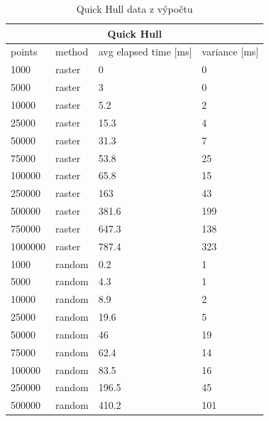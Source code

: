 \documentclass[12pt]{article}
\begin{document}
\begin{table}[h!]
\centering
\caption{Quick Hull data z výpočtu}
\begin{tabular}{|l|l|l|l|}
\hline
\multicolumn{4}{|c|}{\textbf{Quick Hull}}                        \\ \hline
points  & method & avg elapsed time {[}ms{]} & variance {[}ms{]} \\ \hline
1000    & raster & 0                         & 0                 \\ \hline
5000    & raster & 3                         & 0                 \\ \hline
10000   & raster & 5.2                       & 2                 \\ \hline
25000   & raster & 15.3                      & 4                 \\ \hline
50000   & raster & 31.3                      & 7                 \\ \hline
75000   & raster & 53.8                      & 25                \\ \hline
100000  & raster & 65.8                      & 15                \\ \hline
250000  & raster & 163                       & 43                \\ \hline
500000  & raster & 381.6                     & 199               \\ \hline
750000  & raster & 647.3                     & 138               \\ \hline
1000000 & raster & 787.4                     & 323               \\ \hline
1000    & random & 0.2                       & 1                 \\ \hline
5000    & random & 4.3                       & 1                 \\ \hline
10000   & random & 8.9                       & 2                 \\ \hline
25000   & random & 19.6                      & 5                 \\ \hline
50000   & random & 46                        & 19                \\ \hline
75000   & random & 62.4                      & 14                \\ \hline
100000  & random & 83.5                      & 16                \\ \hline
250000  & random & 196.5                     & 45                \\ \hline
500000  & random & 410.2                     & 101               \\ \hline

\end{tabular}
\end{table}
\end{document}
